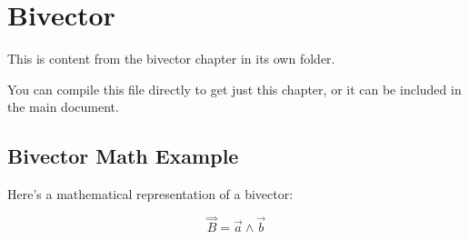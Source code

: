 \documentclass[../../document.tex]{subfiles}
\begin{document}
\chapter{Bivector}
This is content from the bivector chapter in its own folder.

You can compile this file directly to get just this chapter,
or it can be included in the main document.

\section{Bivector Math Example}
Here's a mathematical representation of a bivector:

\[ \overset\Rightarrow{B} = \vec{a} \wedge \vec{b} \]
\end{document}
